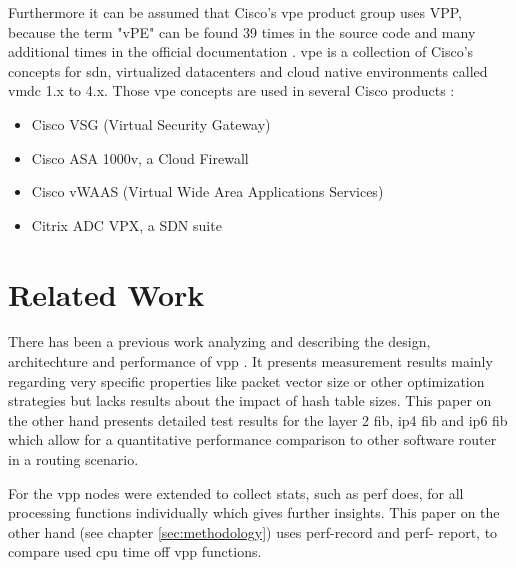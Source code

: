 Furthermore it can be assumed that Cisco's \Ac{vpe} product group uses
VPP, because the term "vPE" can be found 39 times in the source code
and many additional times in the official documentation
\cite{vppdocs}. \Ac{vpe} is a collection of Cisco's concepts for
\Ac{sdn}, virtualized datacenters and cloud native environments called
\Ac{vmdc} 1.x to 4.x. Those \Ac{vpe} concepts are used in several
Cisco products \cite{cisco:sdn}:

\begin{itemize}
	\item Cisco VSG (Virtual Security Gateway)
	\item Cisco ASA 1000v, a Cloud Firewall
	\item Cisco vWAAS (Virtual Wide Area Applications Services)
	\item Citrix ADC VPX, a SDN suite
\end{itemize}


\chapter{Related Work}


There has been a previous work analyzing and describing the design,
architechture and performance of \Ac{vpp} \cite{linguaglossa2017high}.
It presents measurement results mainly regarding very specific
properties like packet vector size or other optimization strategies
but lacks results about the impact of hash table sizes. This paper on
the other hand presents detailed test results for the layer 2
\Ac{fib}, \Ac{ip4} \Ac{fib} and \Ac{ip6} \Ac{fib} which allow for a
quantitative performance comparison to other software router in a
routing scenario.


For \cite{linguaglossa2017high} the vpp nodes were extended to collect
stats, such as \Ac{perf} does, for all processing functions
individually which gives further insights. This paper on the other
hand (see chapter \ref{sec:methodology}) uses perf-record and perf-
report, to compare used cpu time off \Ac{vpp} functions.



